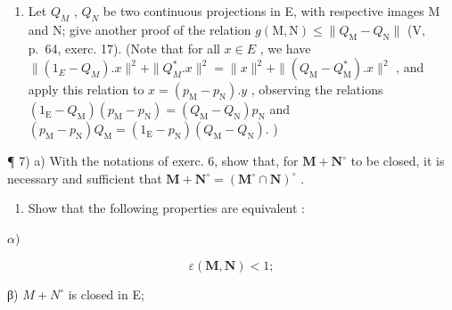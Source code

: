\begin{enumerate}
\def\labelenumi{\alph{enumi})}
\setcounter{enumi}{5}
\tightlist
\item
  Let \(Q_{M}\) , \(Q_{N}\) be two continuous projections in E, with respective images M and N; give another proof of the relation \(g(\mathrm{M}, \mathrm{N}) \leqslant \|Q_{\mathrm{M}} - Q_{\mathrm{N}}\|\) (V, p.~64, exerc. 17). (Note that for all \(x \in E\) , we have \(\|(1_{E} - Q_{M}).x\|^{2} + \|Q_{M}^{*}.x\|^{2} = \|x\|^{2} + \|(Q_{\mathrm{M}} - Q_{\mathrm{M}}^{*}).x\|^{2}\) , and apply this relation to \(x = (p_{\mathrm{M}} - p_{\mathrm{N}}).y\) , observing the relations \((1_{\mathrm{E}} - Q_{\mathrm{M}})(p_{\mathrm{M}} - p_{\mathrm{N}}) = (Q_{\mathrm{M}} - Q_{\mathrm{N}}) p_{\mathrm{N}}\) and \((p_{\mathrm{M}} - p_{\mathrm{N}}) Q_{\mathrm{M}} = (1_{\mathrm{E}} - p_{\mathrm{N}})(Q_{\mathrm{M}} - Q_{\mathrm{N}}).\) )
\end{enumerate}

¶ 7) a) With the notations of exerc. 6, show that, for \(\mathbf{M} + \mathbf{N}^{\circ}\) to be closed, it is necessary and sufficient that \(\mathbf{M} + \mathbf{N}^{\circ} = (\mathbf{M}^{\circ} \cap \mathbf{N})^{\circ}\) .

\begin{enumerate}
\def\labelenumi{\alph{enumi})}
\setcounter{enumi}{1}
\tightlist
\item
  Show that the following properties are equivalent :
\end{enumerate}

\(\alpha)\)

\[
\varepsilon (\mathbf {M}, \mathbf {N}) <   1;
\]

β) \(M + N^{\circ}\) is closed in E;

